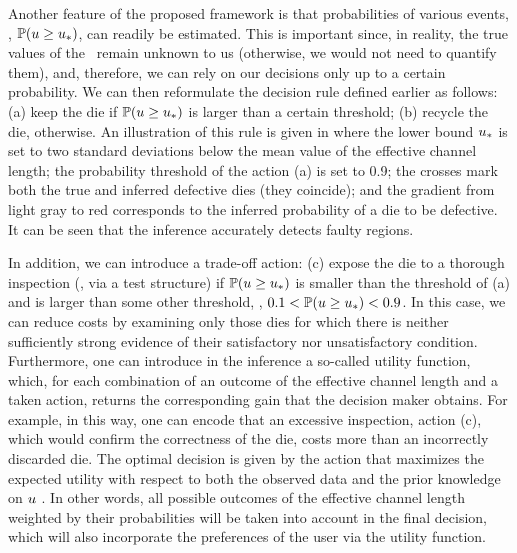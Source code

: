 Another feature of the proposed framework is that probabilities of various events, \eg, $\mathbb{P}(u \geq u_*)$, can readily be estimated.
This is important since, in reality, the true values of the \qoi\ remain unknown to us (otherwise, we would not need to quantify them), and, therefore, we can rely on our decisions only up to a certain probability.
We can then reformulate the decision rule defined earlier as follows: (a) keep the die if $\mathbb{P}(u \geq u_*)$ is larger than a certain threshold; (b) recycle the die, otherwise.
An illustration of this rule is given in  where the lower bound $u_*$ is set to two standard deviations below the mean value of the effective channel length; the probability threshold of the action (a) is set to 0.9; the crosses mark both the true and inferred defective dies (they coincide); and the gradient from light gray to red corresponds to the inferred probability of a die to be defective. It can be seen that the inference accurately detects faulty regions.


In addition, we can introduce a trade-off action: (c) expose the die to a thorough inspection (\eg, via a test structure) if $\mathbb{P}(u \geq u_*)$ is smaller than the threshold of (a) and is larger than some other threshold, \eg, $0.1 < \mathbb{P}(u \geq u_*) < 0.9$. In this case, we can reduce costs by examining only those dies for which there is neither sufficiently strong evidence of their satisfactory nor unsatisfactory condition.
Furthermore, one can introduce in the inference a so-called utility function, which, for each combination of an outcome of the effective channel length and a taken action, returns the corresponding gain that the decision maker obtains.
For example, in this way, one can encode that an excessive inspection, action (c), which would confirm the correctness of the die, costs more than an incorrectly discarded die.
The optimal decision is given by the action that maximizes the expected utility with respect to both the observed data and the prior knowledge on $u$ \cite{bernardo2007}.
In other words, all possible outcomes of the effective channel length weighted by their probabilities will be taken into account in the final decision, which will also incorporate the preferences of the user via the utility function.
